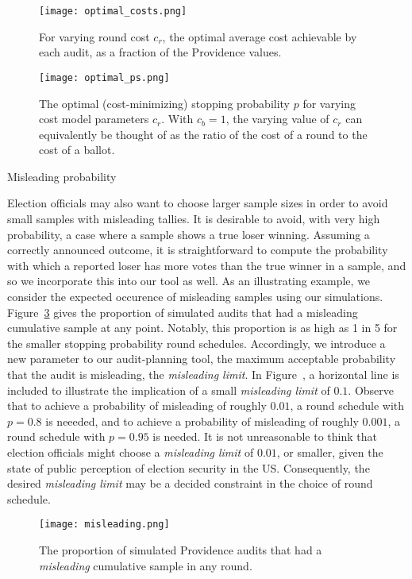 \begin{figure}
\texttt{[image: optimal\_costs.png]}
\caption{For varying round cost $c_r$, the optimal average cost achievable by each audit, as a fraction of the Providence values.}
\label{fig:optimal_costs}
\end{figure}

\begin{figure}
\texttt{[image: optimal\_ps.png]}
\caption{The optimal (cost-minimizing) stopping probability $p$ for varying cost model parameters $c_r$. With $c_b=1$, the varying value of $c_r$ can equivalently be thought of as the ratio of the cost of a round to the cost of a ballot.}
\label{fig:optimal_ps}
\end{figure}

Misleading probability

Election officials may also want to choose larger sample sizes in order to avoid small samples with misleading tallies. It is desirable to avoid, with very high probability, a case where a sample shows a true loser winning. Assuming a correctly announced outcome, it is straightforward to compute the probability with which a reported loser has more votes than the true winner in a sample, and so we incorporate this into our tool as well. 
As an illustrating example, we consider the expected occurence of misleading samples using our simulations. Figure~\ref{fig:misleading} gives the proportion of simulated audits that had a misleading cumulative sample at any point. Notably, this proportion is as high as 1 in 5 for the smaller stopping probability round schedules. Accordingly, we introduce a new parameter to our audit-planning tool, the maximum acceptable probability that the audit is misleading, the \emph{misleading limit}.
In Figure~, a horizontal line is included to illustrate the implication of a small \emph{misleading limit} of $0.1$.
Observe that to achieve a probability of misleading of roughly $0.01$, a round schedule with $p=0.8$ is neeeded, and to achieve a probability of misleading of roughly $0.001$, a round schedule with $p=0.95$ is needed.
It is not unreasonable to think that election officials might choose a \emph{misleading limit} of $0.01$, or smaller, given the state of public perception of election security in the US.
Consequently, the desired \emph{misleading limit} may be a decided constraint in the choice of round schedule.

\begin{figure}
\texttt{[image: misleading.png]}
\caption{The proportion of simulated Providence audits that had a \emph{misleading} cumulative sample in any round.}
\label{fig:misleading}
\end{figure}




